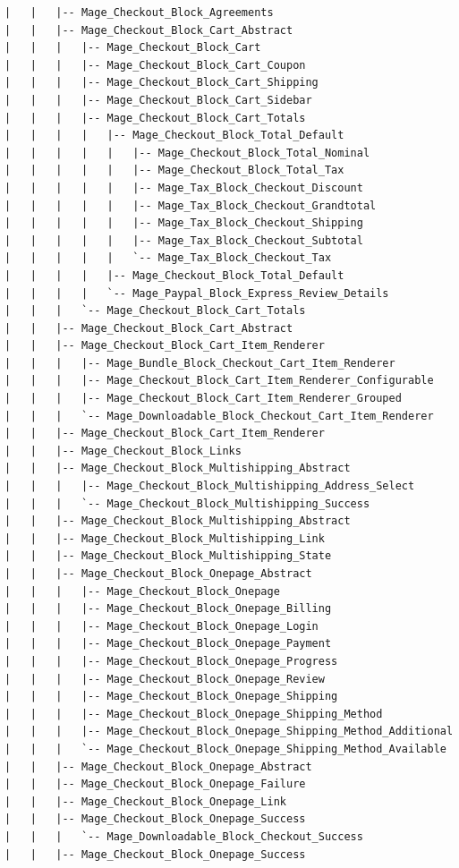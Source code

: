 \documentclass[oneside]{book}
\begin{document}
\begin{lstlisting}
|   |   |-- Mage_Checkout_Block_Agreements
|   |   |-- Mage_Checkout_Block_Cart_Abstract
|   |   |   |-- Mage_Checkout_Block_Cart
|   |   |   |-- Mage_Checkout_Block_Cart_Coupon
|   |   |   |-- Mage_Checkout_Block_Cart_Shipping
|   |   |   |-- Mage_Checkout_Block_Cart_Sidebar
|   |   |   |-- Mage_Checkout_Block_Cart_Totals
|   |   |   |   |-- Mage_Checkout_Block_Total_Default
|   |   |   |   |   |-- Mage_Checkout_Block_Total_Nominal
|   |   |   |   |   |-- Mage_Checkout_Block_Total_Tax
|   |   |   |   |   |-- Mage_Tax_Block_Checkout_Discount
|   |   |   |   |   |-- Mage_Tax_Block_Checkout_Grandtotal
|   |   |   |   |   |-- Mage_Tax_Block_Checkout_Shipping
|   |   |   |   |   |-- Mage_Tax_Block_Checkout_Subtotal
|   |   |   |   |   `-- Mage_Tax_Block_Checkout_Tax
|   |   |   |   |-- Mage_Checkout_Block_Total_Default
|   |   |   |   `-- Mage_Paypal_Block_Express_Review_Details
|   |   |   `-- Mage_Checkout_Block_Cart_Totals
|   |   |-- Mage_Checkout_Block_Cart_Abstract
|   |   |-- Mage_Checkout_Block_Cart_Item_Renderer
|   |   |   |-- Mage_Bundle_Block_Checkout_Cart_Item_Renderer
|   |   |   |-- Mage_Checkout_Block_Cart_Item_Renderer_Configurable
|   |   |   |-- Mage_Checkout_Block_Cart_Item_Renderer_Grouped
|   |   |   `-- Mage_Downloadable_Block_Checkout_Cart_Item_Renderer
|   |   |-- Mage_Checkout_Block_Cart_Item_Renderer
|   |   |-- Mage_Checkout_Block_Links
|   |   |-- Mage_Checkout_Block_Multishipping_Abstract
|   |   |   |-- Mage_Checkout_Block_Multishipping_Address_Select
|   |   |   `-- Mage_Checkout_Block_Multishipping_Success
|   |   |-- Mage_Checkout_Block_Multishipping_Abstract
|   |   |-- Mage_Checkout_Block_Multishipping_Link
|   |   |-- Mage_Checkout_Block_Multishipping_State
|   |   |-- Mage_Checkout_Block_Onepage_Abstract
|   |   |   |-- Mage_Checkout_Block_Onepage
|   |   |   |-- Mage_Checkout_Block_Onepage_Billing
|   |   |   |-- Mage_Checkout_Block_Onepage_Login
|   |   |   |-- Mage_Checkout_Block_Onepage_Payment
|   |   |   |-- Mage_Checkout_Block_Onepage_Progress
|   |   |   |-- Mage_Checkout_Block_Onepage_Review
|   |   |   |-- Mage_Checkout_Block_Onepage_Shipping
|   |   |   |-- Mage_Checkout_Block_Onepage_Shipping_Method
|   |   |   |-- Mage_Checkout_Block_Onepage_Shipping_Method_Additional
|   |   |   `-- Mage_Checkout_Block_Onepage_Shipping_Method_Available
|   |   |-- Mage_Checkout_Block_Onepage_Abstract
|   |   |-- Mage_Checkout_Block_Onepage_Failure
|   |   |-- Mage_Checkout_Block_Onepage_Link
|   |   |-- Mage_Checkout_Block_Onepage_Success
|   |   |   `-- Mage_Downloadable_Block_Checkout_Success
|   |   |-- Mage_Checkout_Block_Onepage_Success

\end{lstlisting}
\end{document}
